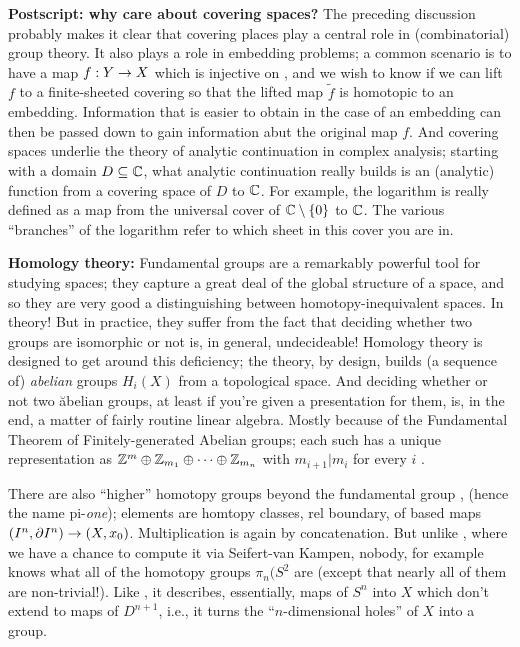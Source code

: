 \msk

{\bf Postscript: why care about covering spaces?} The preceding discussion
probably makes it clear that covering places play a central role in
(combinatorial) group theory. It also plays a role in embedding 
problems; a common scenario is to have a map $f:Y\rightarrow X$ which is 
injective on \mpu , and we wish to know if we can lift $f$ to a 
finite-sheeted covering so that the lifted map $\widetilde{f}$ is 
homotopic to an embedding. Information that is easier to obtain 
in the case of an embedding can then be passed down to gain information
abut the original map $f$. And covering spaces underlie the 
theory of analytic continuation in complex analysis; starting
with a domain $D\subseteq {\Bbb C}$, what analytic continuation really
builds is an (analytic) function from a covering space of $D$ to ${\Bbb C}$.
For example, the logarithm is really defined as a map from 
the universal cover of ${\Bbb C}\setminus\{0\}$ to ${\Bbb C}$. 
The various ``branches'' of the logarithm refer to which sheet
in this cover you are in.

\bsk

{\bf Homology theory:} Fundamental groups are a remarkably powerful
tool for studying spaces; they capture a great deal of the global
structure of a space, and so they are very good a distinguishing
between homotopy-inequivalent spaces. In theory! But in practice,
they suffer from the fact that deciding whether two groups are 
isomorphic or not is, in general, undecideable! Homology theory
is designed to get around this deficiency; the theory, by design,
builds (a sequence of) {\it abelian} groups $H_i(X)$ from a topological
space. And deciding whether or not two \u{abelian} groups, at least
if you're given a presentation for them, is, in the end, a matter of
fairly routine linear algebra. Mostly because of the Fundamental Theorem
of Finitely-generated Abelian groups; each such has a unique representation
as ${\Bbb Z}^m\oplus{\Bbb Z}_{m_1}\oplus\cdots\oplus{\Bbb Z}_{m_n}$
with $m_{i+1}|m_i$ for every $i$ .

\msk

There are also ``higher'' homotopy groups beyond the fundamental group \mpu ,
(hence the name pi-{\it one}); elements are homtopy classes, rel boundary, 
of based maps $(I^n,\partial I^n)\rightarrow(X,x_0)$. Multiplication is again by
concatenation. But unlike \mpu , where we have a chance to compute it
via Seifert-van Kampen, nobody, for example knows what all of the 
homotopy groups $\pi_n(S^2$ are (except that nearly all of them are
non-trivial!). Like \mpu, it describes, essentially, maps of $S^n$ into
$X$ which don't extend to maps of $D^{n+1}$, i.e., it turns the ``$n$-dimensional
holes'' of $X$ into a group.

